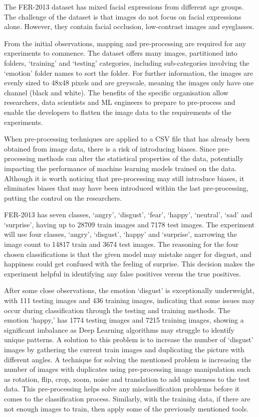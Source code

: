 \documentclass[conference]{IEEEtran}
\begin{document}
      The FER-2013 dataset has mixed facial expressions from different age groups. The challenge of the dataset is that images do not focus on facial expressions alone. However, they contain facial occlusion, low-contrast images and eyeglasses.

      From the initial observations, mapping and pre-processing are required for any experiments to commence. The dataset offers many images, partitioned into folders, `training' and `testing' categories, including sub-categories involving the `emotion' folder names to sort the folder. For further information, the images are evenly sized to 48x48 pixels and are greyscale, meaning the images only have one channel (black and white). The benefits of the specific organisation allow researchers, data scientists and ML engineers to prepare to pre-process and enable the developers to flatten the image data to the requirements of the experiments. 
      
      When pre-processing techniques are applied to a CSV file that has already been obtained from image data, there is a risk of introducing biases. Since pre-processing methods can alter the statistical properties of the data, potentially impacting the performance of machine learning models trained on the data. Although it is worth noticing that pre-processing may still introduce biases, it eliminates biases that may have been introduced within the last pre-processing, putting the control on the researchers.

      FER-2013 has seven classes, `angry', `disgust', `fear', `happy', `neutral', `sad' and `surprise', having up to 28709 train images and 7178 test images. The experiment will use four classes, `angry', `disgust', `happy' and `surprise', narrowing the image count to 14817 train and 3674 test images. The reasoning for the four chosen classifications is that the given model may mistake anger for disgust, and happiness could get confused with the feeling of surprise. This decision makes the experiment helpful in identifying any false positives versus the true positives.

      After some close observations, the emotion `disgust' is exceptionally underweight, with 111 testing images and 436 training images, indicating that some issues may occur during classification through the testing and training methods. The emotion `happy,' has 1774 testing images and 7215 training images, showing a significant imbalance as Deep Learning algorithms may struggle to identify unique patterns. A solution to this problem is to increase the number of `disgust' images by gathering the current train images and duplicating the picture with different angles. A technique for solving the mentioned problem is increasing the number of images with duplicates using pre-processing image manipulation such as rotation, flip, crop, zoom, noise and translation to add uniqueness to the test data. This pre-processing helps solve any misclassification problems before it comes to the classification process. Similarly, with the training data, if there are not enough images to train, then apply some of the previously mentioned tools.
\end{document}
